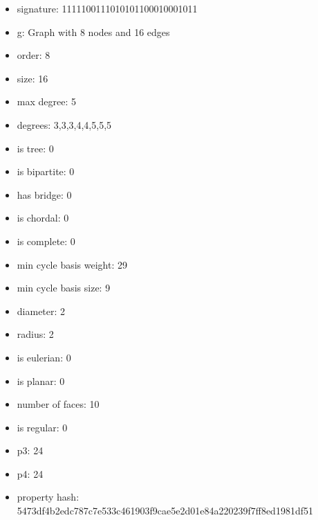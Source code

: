 \begin{itemize}
\item signature: 1111100111010101100010001011
\item g: Graph with 8 nodes and 16 edges
\item order: 8
\item size: 16
\item max degree: 5
\item degrees: 3,3,3,4,4,5,5,5
\item is tree: 0
\item is bipartite: 0
\item has bridge: 0
\item is chordal: 0
\item is complete: 0
\item min cycle basis weight: 29
\item min cycle basis size: 9
\item diameter: 2
\item radius: 2
\item is eulerian: 0
\item is planar: 0
\item number of faces: 10
\item is regular: 0
\item p3: 24
\item p4: 24
\item property hash: 5473df4b2edc787c7e533c461903f9cae5e2d01e84a220239f7ff8ed1981df51
\end{itemize}
\newpage
\begin{figure}
\end{figure}
